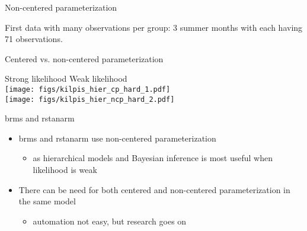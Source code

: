 \documentclass[finnish,english,t]{beamer}
\begin{document}
\begin{frame}[fragile]{Non-centered parameterization}

  First data with many observations per group: 3 summer months with
  each having 71 observations.


  
\end{frame}

\begin{frame}[fragile]{Centered vs. non-centered parameterization}

  \vspace{-1\baselineskip}
  \hspace{15mm} Strong likelihood \hspace{14mm} Weak likelihood\\
  {\texttt{[image: figs/kilpis\_hier\_cp\_hard\_1.pdf]}}\\
  {\texttt{[image: figs/kilpis\_hier\_ncp\_hard\_2.pdf]}}\\
  \vspace{-80mm}
  
\end{frame}

\begin{frame}[fragile]{brms and rstanarm}

  \begin{itemize}
  \item brms and rstanarm use non-centered parameterization
    \begin{itemize}
    \item as hierarchical models and Bayesian inference is most useful
      when likelihood is weak
    \end{itemize}
  \item There can be need for both centered and non-centered
    parameterization in the same model
    \begin{itemize}
    \item automation not easy, but research goes on
    \end{itemize}
  \end{itemize}
\end{frame}
\end{document}
